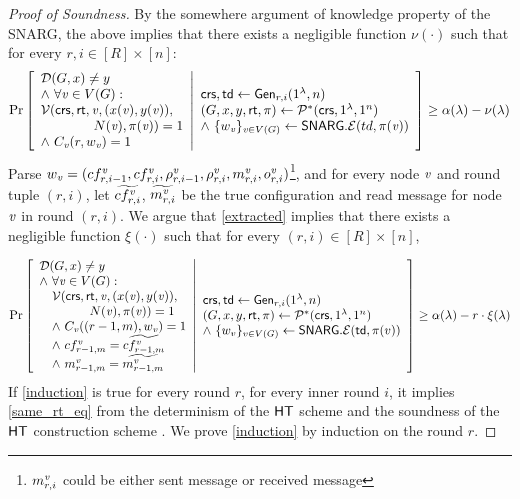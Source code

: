 \begin{proof}[Proof of Soundness]
By the somewhere argument of knowledge property of the SNARG, the above implies that there exists a negligible function $\nu(\cdot)$ such that for every $r,i\in[R]\times [n]$:
\begin{gather}\label{extracted}
    \Pr \left[ \begin{array}{ll} 
    \mathcal{D}(G, x)\neq y \\
    \wedge\ \forall \mathit{ v }\in V(G) : \\
    \mathcal{V}(\mathsf{crs}, \mathsf{rt}, \mathit{ v }, (x(\mathit{ v }), y(\mathit{ v })),\\
    \qquad \qquad N(\mathit{ v }), \pi(\mathit{ v })) = 1 \\
    \wedge ~ C_{\mathit{ v }}(r, w_{\mathit{ v }}) = 1
     \end{array} \middle\vert \begin{array}{ll} 
    \mathsf{crs}, \mathsf{td} \leftarrow \mathsf{Gen}_{r,i}(1^\lambda, n) \\
    (G, x, y, \mathsf{rt}, \pi) \leftarrow \mathcal{P}^*(\mathsf{crs}, 1^\lambda, 1^n) \\
    \wedge ~\{w_{\mathit{ v }}\}_{\mathit{ v }\in V(G)}\leftarrow \mathsf{SNARG}.\mathcal{E}(td, \pi(\mathit{ v }))
     \end{array} \right] \geq \alpha(\lambda) - \nu(\lambda)
\end{gather}
Parse $w_{\mathit{ v }} = (cf^{\mathit{ v }}_{r, i-1}, cf^{\mathit{ v }}_{r, i}, \rho^{\mathit{ v }}_{r, i-1}, \rho^{\mathit{ v }}_{r,i}, m^{\mathit{ v }}_{r,i}, o^{\mathit{ v }}_{r,i})$\footnote{$m^{\mathit{ v }}_{r,i}$ could be either sent message or received message}, and for every node $\mathit{ v }$ and round tuple $(r,i)$, let $\widetilde{cf^{\mathit{ v }}_{r,i}}$, $\widetilde{m^{\mathit{ v }}_{r,i}}$ be the true configuration and read message for node $\mathit{ v }$ in round $(r,i)$. We argue that \cref{extracted} implies that there exists a negligible function $\xi(\cdot)$ such that for every $(r,i) \in [R]\times[n]$,

\begin{gather}\label{induction}
    \Pr \left[ \begin{array}{ll} 
    \mathcal{D}(G, x)\neq y  \\
    \wedge\ \forall \mathit{ v }\in V(G) : \\
    \quad \mathcal{V}(\mathsf{crs}, \mathsf{rt}, \mathit{ v }, (x(\mathit{ v }), y(\mathit{ v })),\\
    \qquad \qquad N(\mathit{ v }), \pi(\mathit{ v })) = 1 \\
    \quad \wedge ~C_{\mathit{ v }}((r-1, m), w_{\mathit{ v }}) = 1 \\
    \quad \wedge ~cf^{\mathit{ v }}_{r-1, m} = \widetilde{cf^{\mathit{ v }}_{r-1,m}} \\
    \quad \wedge ~m^{\mathit{ v }}_{r-1,m} = \widetilde{m^{\mathit{ v }}_{r-1,m}}
     \end{array} \middle\vert \begin{array}{ll} 
    \mathsf{crs}, \mathsf{td} \leftarrow \mathsf{Gen}_{r,i}(1^\lambda, n) \\
    (G, x, y, \mathsf{rt}, \pi) \leftarrow \mathcal{P}^*(\mathsf{crs}, 1^\lambda, 1^n)\\
    \wedge ~\{w_v\}_{v\in V(G)}\leftarrow \mathsf{SNARG}.\mathcal{E}(\mathsf{td}, \pi(v))
     \end{array} \right] \geq \alpha(\lambda) - r\cdot\xi(\lambda)
\end{gather}
If \cref{induction} is true for every round $r$, for every inner round $i$, it implies \cref{same_rt_eq} from the determinism of the $\mathsf{HT}$ scheme and the soundness of the $\mathsf{HT}$ construction scheme . We prove \cref{induction} by induction on the round $r$. 


\end{proof}
